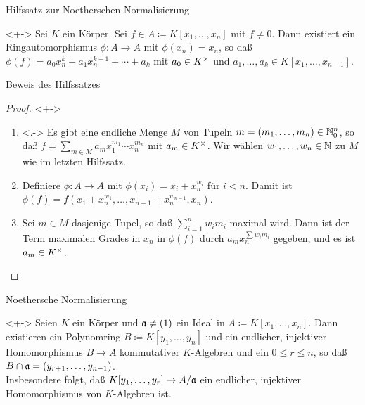 \begin{frame}{Hilfssatz zur Noetherschen Normalisierung}
	\begin{lemma}<+->
		Sei \(K\) ein Körper. Sei \(f \in A \coloneqq K[x_1, \dotsc, x_n]\) mit
		\(f \neq 0\).
		Dann existiert ein Ringautomorphismus \(\phi\colon A \to A\) mit
		\(\phi(x_n) = x_n\), so daß
		\(
		\phi(f) = a_0 x_n^k + a_1 x_n^{k - 1} + \dotsb + a_k\)
		mit \(a_0 \in K^\times\) und \(a_1, \dotsc, a_k \in K[x_1, \dotsc, x_{n - 1}]\).
	\end{lemma}
\end{frame}

\begin{frame}{Beweis des Hilfssatzes}
	\begin{proof}<+->
		\begin{enumerate}[<+->]
		\item<.->
			Es gibt eine endliche Menge \(M\) von Tupeln \(m = (m_1, \dotsc,
			m_n) \in \mathbb N_0^n\), so daß \(f = \sum\limits_{m \in M}
			a_m x_1^{m_1} \dotsm x_n^{m_n}\) mit \(a_m \in K^\times\). Wir
			wählen \(w_1, \dotsc, w_n \in \mathbb N\) zu \(M\) wie im letzten
			Hilfssatz.
		\item
			Definiere \(\phi\colon A \to A\) mit \(\phi(x_i) = x_i + x_n^{w_i}\)
			für \(i < n\). Damit ist
			\(\phi(f) = f(x_1 + x_n^{w_1},
			\dotsc, x_{n - 1} + x_n^{w_{n - 1}}, x_n)\).
		\item
			Sei \(m \in M\) dasjenige Tupel, so daß \(\sum\limits_{i = 1}^n
			w_i m_i\) maximal wird. Dann ist der Term maximalen Grades in
			\(x_n\) in \(\phi(f)\) durch \(a_m x_n^{\sum w_i m_i}\) gegeben,
			und es ist \(a_m \in K^\times\).
		\qedhere
		\end{enumerate}
	\end{proof}
\end{frame}

\begin{frame}{Noethersche Normalisierung}
	\begin{proposition}<+->
		\label{prop:noether_norm}
		Seien \(K\) ein Körper und \(\mathfrak{a} \neq (1)\) ein Ideal in \(A \coloneqq K[x_1, \dotsc, x_n]\).
		Dann existieren ein Polynomring \(B \coloneqq K[y_1, \dotsc, y_n]\) und ein endlicher, injektiver
		Homomorphismus \(B \to A\) kommutativer \(K\)-Algebren und ein \(0 \leq r \leq n\), so daß
		\(B \cap \mathfrak{a} = (y_{r + 1}, \dotsc, y_{n-1})\).
		\\
		Insbesondere folgt, daß \(K[y_1, \dotsc, y_r] \to A/\mathfrak{a}\) ein endlicher, injektiver Homomorphismus
		von \(K\)-Algebren ist.
	\end{proposition}
\end{frame}

